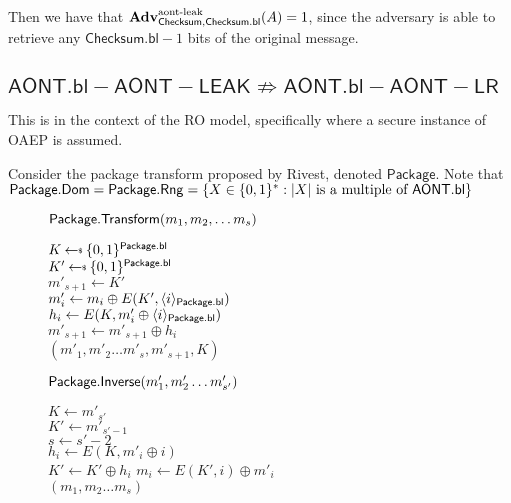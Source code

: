 \documentclass[11pt,twoside]{article}
\begin{document}
Then we have that $\textbf{Adv}^\text{aont-leak}_{\mathsf{Checksum},\mathsf{Checksum.bl}}(A)=1$, since the adversary is able to retrieve any $\mathsf{Checksum.bl}-1$ bits of the original message. 

\subsection{$\mathsf{AONT.bl-AONT-LEAK}\not\Rightarrow \mathsf{AONT.bl-AONT-LR}$}

This is in the context of the RO model, specifically where a secure instance of OAEP is assumed.

Consider the package transform proposed by Rivest, denoted $\mathsf{Package}$. Note that $\mathsf{Package.Dom} = \mathsf{Package.Rng}=\{X\in\{0,1\}^* : |X| \text{ is a multiple of } \mathsf{AONT.bl}\}$

\begin{figure}[H]
{
\underline{$\mathsf{Package.Transform}(m_1,m_2,\dots m_s)$}

\begin{algorithm}[H]
$K\getsr \bits^\schemefont{Package.bl}$\\
$K'\getsr \bits^\schemefont{Package.bl}$\\
$m'_{s+1}\gets K'$\\
{
$m'_i\gets m_i \oplus E(K',\langle i \rangle_{\mathsf{Package.bl}})$\\
$h_i\gets E(K,m'_i\oplus \langle i \rangle_{\mathsf{Package.bl}})$\\
$m'_{s+1}\gets m'_{s+1}\oplus h_i$\\
}
\Return $(m'_1,m'_2\dots m'_s, m'_{s+1}, K)$
\end{algorithm}
}
{
\underline{$\mathsf{Package.Inverse}(m'_1,m'_2\dots m'_{s'})$}

\begin{algorithm}[H]
$K\gets m'_{s'}$\\
$K'\gets m'_{s'-1}$\\
$s\gets s'-2$\\
{
$h_i\gets E(K,m'_i\oplus i)$\\
$K'\gets K'\oplus h_i$
}
{
$m_i\gets E(K',i)\oplus m'_i$\\
}
\Return $(m_1,m_2\dots m_{s})$
\end{algorithm}
}
\end{figure} 
\end{document}
